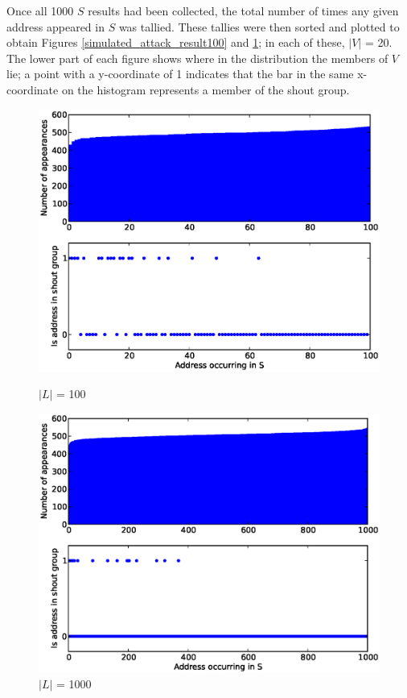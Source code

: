 \documentclass[ %
                    author={Luke Murray},
                supervisor={Dr. Simon Hollis},
                     title={Shadow Peer-to-Peer Networks},
                  subtitle={},
                    degree={MEng},
                      year={2013} ]{thesis}
\begin{document}
Once all 1000 $S$ results had been collected, the total number of times any given address appeared in $S$ was tallied. These tallies were then sorted and plotted to obtain Figures \ref{simulated_attack_result100} and \ref{simulated_attack_result1000}; in each of these, $|V|$ = 20. The lower part of each figure shows where in the distribution the members of $V$ lie; a point with a y-coordinate of 1 indicates that the bar in the same x-coordinate on the histogram represents a member of the shout group.

\begin{figure}[h]
    \centering
    \begin{minipage}[b]{0.4\linewidth}
        \centering
        \includegraphics[width=\linewidth]{diagrams/split100.eps}
        \caption{$|L|$ = 100}
        \label{simulated_attack_result100}
    \end{minipage}
    \hspace{0.5cm}
    \begin{minipage}[b]{0.4\linewidth}
        \centering
        \includegraphics[width=\linewidth]{diagrams/split1000.eps}
        \caption{$|L|$ = 1000}
        \label{simulated_attack_result1000}
    \end{minipage}
\end{figure}
\end{document}
